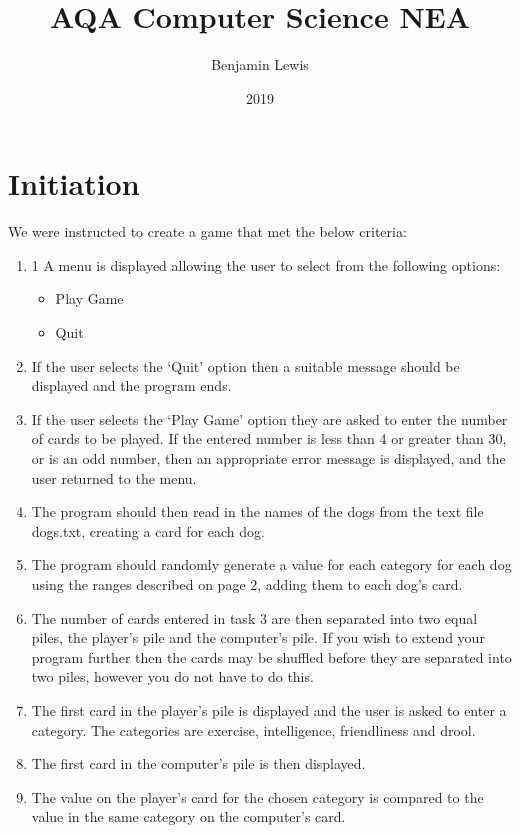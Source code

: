 \documentclass[a4paper]{article}
\title{AQA Computer Science NEA}
\author{Benjamin Lewis}
\date{2019}
\begin{document}
	\begin{titlepage}
		\maketitle
		\tableofcontents
	\end{titlepage}
	\section{Initiation}
	We were instructed to create a game that met the below criteria: 
	\begin{enumerate}
		\item 1 A menu is displayed allowing the user to select from the following options:
		\begin{itemize}
			\item Play Game
			\item Quit
		\end{itemize}
		\item If the user selects the ‘Quit’ option then a suitable message should be displayed and the program ends.
		\item If the user selects the ‘Play Game’ option they are asked to enter the number of cards to be played. If the entered number is less than 4 or greater than 30, or is an odd number, then an appropriate error message is displayed, and the user returned to the menu.
		\item The program should then read in the names of the dogs from the text file dogs.txt, creating a card for each dog.
		\item The program should randomly generate a value for each category for each dog using the ranges described on page 2, adding them to each dog’s card.
		\item The number of cards entered in task 3 are then separated into two equal piles, the player’s pile and the computer’s pile. If you wish to extend your program further then the cards may be shuffled before they are separated into two piles, however you do not have to do this.
		\item The first card in the player’s pile is displayed and the user is asked to enter a category. The categories are exercise, intelligence, friendliness and drool.
		\item The first card in the computer’s pile is then displayed.
		\item The value on the player’s card for the chosen category is compared to the value in the same category on the computer’s card.
		\begin{itemize}

\end{itemize}
\end{enumerate}
\end{document}

